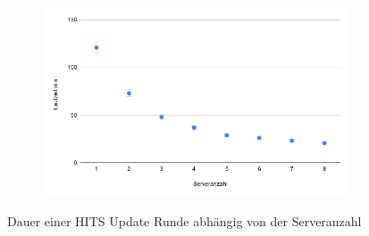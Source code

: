 \begin{figure}
  \centering
  \begin{subfigure}[b]{1.0\textwidth}
    \includegraphics[width=1.0\linewidth]{img/eval_hits.png}
  \end{subfigure}
  \caption{Dauer einer HITS Update Runde abhängig von der Serveranzahl}
  \label{eval:hits}
\end{figure}
